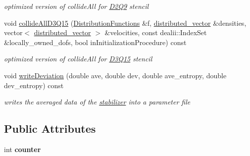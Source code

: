\begin{DoxyCompactItemize}
\begin{DoxyCompactList}\small\item\em optimized version of collideAll for \hyperlink{classnatrium_1_1D2Q9}{D2Q9} stencil \item\end{DoxyCompactList}\item 
\hypertarget{classnatrium_1_1KBCStandard_a9ce76f9d02120b79a12b883b67268caa}{
void \hyperlink{classnatrium_1_1KBCStandard_a9ce76f9d02120b79a12b883b67268caa}{collideAllD3Q15} (\hyperlink{classnatrium_1_1DistributionFunctions}{DistributionFunctions} \&f, \hyperlink{namespacenatrium_a903d2b92917f582f2ff05f52160ab811}{distributed\_\-vector} \&densities, vector$<$ \hyperlink{namespacenatrium_a903d2b92917f582f2ff05f52160ab811}{distributed\_\-vector} $>$ \&velocities, const dealii::IndexSet \&locally\_\-owned\_\-dofs, bool inInitializationProcedure) const }
\label{classnatrium_1_1KBCStandard_a9ce76f9d02120b79a12b883b67268caa}

\begin{DoxyCompactList}\small\item\em optimized version of collideAll for \hyperlink{classnatrium_1_1D3Q15}{D3Q15} stencil \item\end{DoxyCompactList}\item 
\hypertarget{classnatrium_1_1KBCStandard_a2746649a1c6b4b0cf655b149a3e347dc}{
void \hyperlink{classnatrium_1_1KBCStandard_a2746649a1c6b4b0cf655b149a3e347dc}{writeDeviation} (double ave, double dev, double ave\_\-entropy, double dev\_\-entropy) const }
\label{classnatrium_1_1KBCStandard_a2746649a1c6b4b0cf655b149a3e347dc}

\begin{DoxyCompactList}\small\item\em writes the averaged data of the \hyperlink{structnatrium_1_1KBCStandard_1_1stabilizer}{stabilizer} into a parameter file \item\end{DoxyCompactList}\end{DoxyCompactItemize}
\subsection*{Public Attributes}
\begin{DoxyCompactItemize}
\item 
\hypertarget{classnatrium_1_1KBCStandard_a68610043a08520a41b8c3473ae644ca3}{
int {\bfseries counter}}
\label{classnatrium_1_1KBCStandard_a68610043a08520a41b8c3473ae644ca3}

\end{DoxyCompactItemize}


